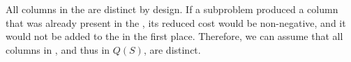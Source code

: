 \begin{note}\label{note:distinct_columns}
All columns in the \RMP{} are distinct by design. If a subproblem produced a column that was already present in the \RMP{}, its reduced cost would be non-negative, and it would not be added to the \RMP{} in the first place. Therefore, we can assume that all columns in \RMP{}, and thus in $Q(S)$, are distinct.
\end{note}

